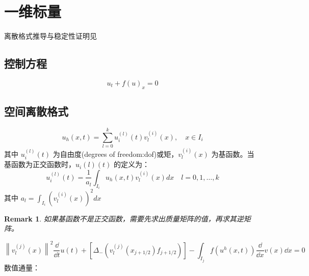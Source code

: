 \documentclass{article}
\newtheorem{remark}{Remark}
\numberwithin{equation}{subsection}    %
\begin{document}
\section{一维标量}
离散格式推导与稳定性证明见\cite{RN16}
\subsection{控制方程}
\begin{equation}
    u_t+f(u)_x = 0
\end{equation}
\subsection{空间离散格式}
\begin{equation}
    u_{h}(x, t)=\sum_{l=0}^{k} u_{i}^{(l)}(t) v_{l}^{(i)}(x), \quad x \in I_{i}
\end{equation}
其中 $u_i^{(l)}(t)$ 为自由度(degrees of freedom:dof)或矩，$v_l^{(i)}(x)$ 为基函数。当基函数为正交函数时，$u_i{(l)}(t)$ 的定义为：
\begin{equation}
    u_{i}^{(l)}(t)=\frac{1}{a_{l}} \int_{I_{i}} u_{h}(x, t) v_{l}^{(i)}(x) d x \quad l=0,1, \ldots, k
\end{equation}
其中 $a_{l}=\int_{I_{i}}\left(v_{l}^{(i)}(x)\right)^{2} d x$
\begin{remark}
    如果基函数不是正交函数，需要先求出质量矩阵的值，再求其逆矩阵。
\end{remark}

\begin{equation}
    \left\|v_{l}^{(j)}(x)\right\|^{2} \dfrac{\dd}{\dd t} u(t)+\left[\Delta_{-}\left(v_{l}^{(j)}\left(x_{j+1 / 2}\right) f_{j+1 / 2}\right)\right]-\int_{I_{j}} f\left(u^{h}(x, t)\right) \dfrac{\dd}{\dd x} v(x) \dd x=0
\end{equation}
数值通量：
\end{document}
